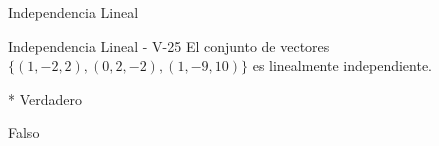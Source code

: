 \documentclass[a4,11pt]{aleph-notas}
\begin{document}
\begin{quiz}{Independencia Lineal}
\begin{multi}[numbering = none, shuffle = false]%
    {Independencia Lineal - V-25}
    El conjunto de vectores $\{ (1,-2,2) , (0,2,-2), (1, -9, 10) \}$ es linealmente independiente.
    \item[]* Verdadero 
    \item[] Falso
\end{multi}



\end{quiz}
\end{document}
